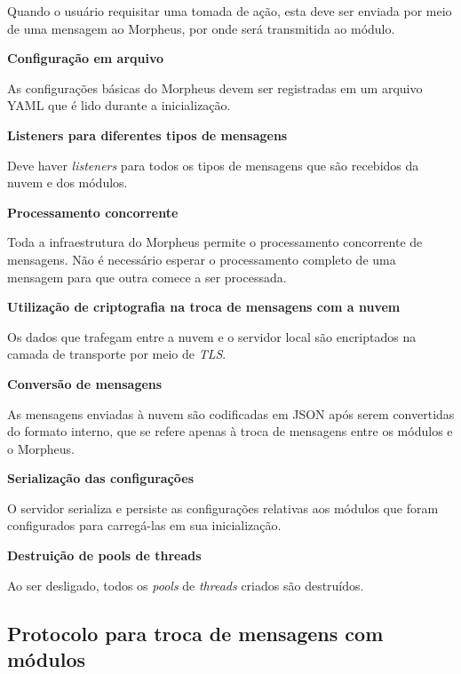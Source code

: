 \begin{description}
Quando o usuário requisitar uma tomada de ação, esta deve ser enviada por meio de uma mensagem ao Morpheus, por onde será transmitida ao módulo.

\item \textbf{Configuração em arquivo}

As configurações básicas do Morpheus devem ser registradas em um arquivo YAML que é lido durante a inicialização.

\item \textbf{Listeners para diferentes tipos de mensagens}

Deve haver \emph{listeners} para todos os tipos de mensagens que são recebidos da nuvem e dos módulos.

\item \textbf{Processamento concorrente}

Toda a infraestrutura do Morpheus permite o processamento concorrente de mensagens. Não é necessário esperar o processamento completo de uma mensagem para que outra comece a ser processada.

\item \textbf{Utilização de criptografia na troca de mensagens com a nuvem}

Os dados que trafegam entre a nuvem e o servidor local são encriptados na camada de transporte por meio de \emph{TLS}.

\item \textbf{Conversão de mensagens}

As mensagens enviadas à nuvem são codificadas em JSON após serem convertidas do formato interno, que se refere apenas à troca de mensagens entre os módulos e o Morpheus.

\item \textbf{Serialização das configurações}

O servidor serializa e persiste as configurações relativas aos módulos que foram configurados para carregá-las em sua inicialização.

\item \textbf{Destruição de pools de threads}

Ao ser desligado, todos os \emph{pools} de \emph{threads} criados são destruídos.

\end{description}

\subsection{Protocolo para troca de mensagens com módulos}


